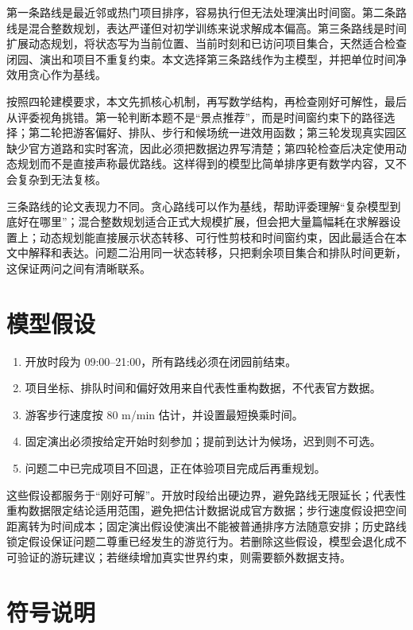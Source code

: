 \documentclass[UTF8,12pt,a4paper]{ctexart}
\begin{document}
第一条路线是最近邻或热门项目排序，容易执行但无法处理演出时间窗。第二条路线是混合整数规划，表达严谨但对初学训练来说求解成本偏高。第三条路线是时间扩展动态规划，将状态写为当前位置、当前时刻和已访问项目集合，天然适合检查闭园、演出和项目不重复约束。本文选择第三条路线作为主模型，并把单位时间净效用贪心作为基线。

按照四轮建模要求，本文先抓核心机制，再写数学结构，再检查刚好可解性，最后从评委视角挑错。第一轮判断本题不是“景点推荐”，而是时间窗约束下的路径选择；第二轮把游客偏好、排队、步行和候场统一进效用函数；第三轮发现真实园区缺少官方道路和实时客流，因此必须把数据边界写清楚；第四轮检查后决定使用动态规划而不是直接声称最优路线。这样得到的模型比简单排序更有数学内容，又不会复杂到无法复核。

三条路线的论文表现力不同。贪心路线可以作为基线，帮助评委理解“复杂模型到底好在哪里”；混合整数规划适合正式大规模扩展，但会把大量篇幅耗在求解器设置上；动态规划能直接展示状态转移、可行性剪枝和时间窗约束，因此最适合在本文中解释和表达。问题二沿用同一状态转移，只把剩余项目集合和排队时间更新，这保证两问之间有清晰联系。

\section{模型假设}

\begin{enumerate}
  \item 开放时段为 09:00--21:00，所有路线必须在闭园前结束。
  \item 项目坐标、排队时间和偏好效用来自代表性重构数据，不代表官方数据。
  \item 游客步行速度按 80 m/min 估计，并设置最短换乘时间。
  \item 固定演出必须按给定开始时刻参加；提前到达计为候场，迟到则不可选。
  \item 问题二中已完成项目不回退，正在体验项目完成后再重规划。
\end{enumerate}

这些假设都服务于“刚好可解”。开放时段给出硬边界，避免路线无限延长；代表性重构数据限定结论适用范围，避免把估计数据说成官方数据；步行速度假设把空间距离转为时间成本；固定演出假设使演出不能被普通排序方法随意安排；历史路线锁定假设保证问题二尊重已经发生的游览行为。若删除这些假设，模型会退化成不可验证的游玩建议；若继续增加真实世界约束，则需要额外数据支持。

\section{符号说明}
\end{document}
